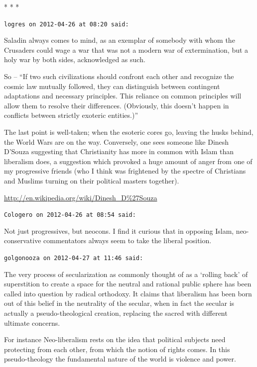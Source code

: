 
\begin{center}* * *\end{center}

\begin{footnotesize}
\begin{sffamily}
\texttt{logres on 2012-04-26 at 08:20 said:}

Saladin always comes to mind, as an exemplar of somebody with whom the Crusaders could wage a war that was not a modern war of extermination, but a holy war by both sides, acknowledged as such.

So -- ``If two such civilizations should confront each other and recognize the cosmic law mutually followed, they can distinguish between contingent adaptations and necessary principles. This reliance on common principles will allow them to resolve their differences. (Obviously, this doesn't happen in conflicts between strictly exoteric entities.)''

The last point is well-taken; when the esoteric cores go, leaving the husks behind, the World Wars are on the way. Conversely, one sees someone like Dinesh D'Souza suggesting that Christianity has more in common with Islam than liberalism does, a suggestion which provoked a huge amount of anger from one of my progressive friends (who I think was frightened by the spectre of Christians and Muslims turning on their political masters together).

\url{http://en.wikipedia.org/wiki/Dinesh_D\%27Souza}


\hfill

\texttt{Cologero on 2012-04-26 at 08:54 said:}

Not just progressives, but neocons. I find it curious that in opposing Islam, neo-conservative commentators always seem to take the liberal position.

\hfill

\texttt{golgonooza on 2012-04-27 at 11:46 said:}

The very process of secularization as commonly thought of as a `rolling back' of superstition to create a space for the neutral and rational public sphere has been called into question by radical orthodoxy. It claims that liberalism has been born out of this belief in the neutrality of the secular, when in fact the secular is actually a pseudo-theological creation, replacing the sacred with different ultimate concerns.

For instance Neo-liberalism rests on the idea that political subjects need protecting from each other, from which the notion of rights comes. In this pseudo-theology the fundamental nature of the world is violence and power.


\end{sffamily}
\end{footnotesize}
